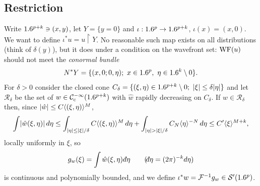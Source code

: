 \subsection{Restriction}
Write $1.6^{p+k}\ni(x,y)$, let $Y=\{y=0\}$ and $\iota:1.6^p\to1.6^{p+k}$,
$\iota(x)=(x,0)$. We want to define $\iota^*u=u\restriction Y$. No reasonable
such map exists on all distributions (think of $\delta(y)$), but it does under
a condition on the wavefront set: $\operatorname{WF}(u)$ should not meet the \emph{conormal
bundle}
\begin{equation*}
  N^*Y=\{(x,0;0,\eta);\ x\in\R^p,\ \eta\in\R^k\setminus0\}.
\end{equation*}
For $\delta>0$ consider the closed cone
$C_\delta=\{(\xi,\eta)\in\R^{p+k}\setminus0;\ \abs\xi\le\delta\abs\eta\}$ and
let $\mathcal R_\delta$ be the set of $w\in\mathcal{C}^{-\infty}_{\mathrm{c}}(1.6^{p+k})$ with $\hat w$
rapidly decreasing on $C_\delta$. If $w\in\mathcal R_\delta$ then, since
$\lvert \hat w\rvert\le C\langle (\xi,\eta)\rangle^M$,
\begin{equation}\label{microlocal:eq:restriction-int}
  \int\lvert \hat w(\xi,\eta)\rvert\,d\eta\le
  \int_{\lvert \eta\rvert\le\lvert \xi\rvert/\delta}C\langle (\xi,\eta)\rangle^M\,d\eta
  +\int_{\lvert \eta\rvert>\lvert \xi\rvert/\delta}C_N\langle \eta\rangle^{-N}\,d\eta\le C'\langle \xi\rangle^{M+k},
\end{equation}
locally uniformly in $\xi$, so
\begin{equation*}
  g_w(\xi)=\int\hat w(\xi,\eta)\,\dbar\eta\qquad
  (\dbar\eta=(2\pi)^{-k}d\eta)
\end{equation*}
is continuous and polynomially bounded, and we define
$\iota^*w=\mathcal{F}^{-1}g_w\in\mathcal{S}'(1.6^p)$.

